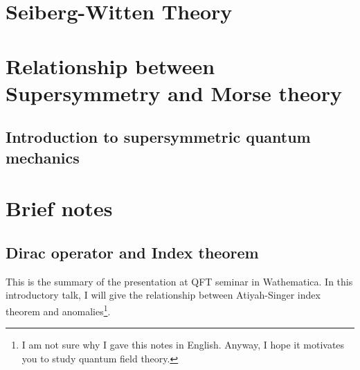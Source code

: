 \documentclass[a4paper,pdftex,10pt]{report}
\begin{document}
\clearpage
\appendix
\chapter{Seiberg-Witten Theory}




























\clearpage
\chapter{Relationship between Supersymmetry and Morse theory}



\section{Introduction to supersymmetric quantum mechanics}
























\clearpage
\chapter{Brief notes}

\section{Dirac operator and Index theorem}

This is the summary of the presentation at QFT seminar in Wathematica. In this introductory talk, I will give the relationship between Atiyah-Singer index theorem and anomalies\footnote{
  I am not sure why I gave this notes in English. Anyway, I hope it motivates you to study quantum field theory.
}. 
\end{document}
